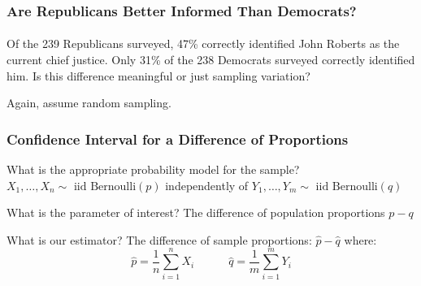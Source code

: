 \documentclass[handout]{beamer}
\begin{document}
\begin{frame}
\frametitle{Are Republicans Better Informed Than Democrats?}
\framesubtitle{}
Of the 239 Republicans surveyed, 47\% correctly identified John Roberts as the current chief justice. Only 31\% of the 238 Democrats surveyed correctly identified him. Is this difference meaningful or just sampling variation?

\vspace{2em}
\alert{Again, assume random sampling.}



\end{frame}
\begin{frame}
\frametitle{Confidence Interval for a Difference of Proportions}
	\begin{block}{What is the appropriate probability model for the sample?} 
$X_1, \hdots, X_n \sim \mbox{ iid Bernoulli}(p)$ independently  of $Y_1, \hdots, Y_m \sim \mbox{ iid Bernoulli}(q)$
\end{block}
	\begin{block}{What is the parameter of interest?}
The difference of population proportions $p - q$
\end{block}

\begin{block}{What is our estimator?}
The difference of sample proportions: $\widehat{p} - \widehat{q}$ where:
	$$\widehat{p} = \frac{1}{n}\sum_{i=1}^n X_i \quad \quad \quad	\widehat{q} = \frac{1}{m}\sum_{i=1}^m Y_i$$
\end{block}
\end{frame}

\end{document}
